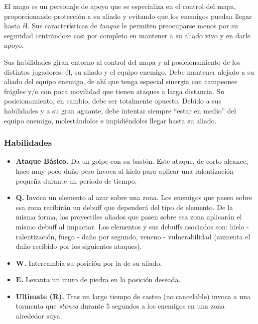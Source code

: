 El mago es un personaje de apoyo que se especializa en el control del mapa, proporcionando protección a su aliado y evitando que los enemigos puedan llegar hasta él. Sus características de \emph{tanque} le permiten preocuparse menos por su seguridad centrándose casi por completo en mantener a su aliado vivo y en darle apoyo.

Sus habilidades giran entorno al control del mapa y al posicionamiento de los distintos jugadores: él, su aliado y el equipo enemigo. Debe mantener alejado a su aliado del equipo enemigo, de ahí que tenga especial sinergia con campeones frágiles y/o con poca movilidad que tienen ataques a larga distancia. Su posicionamiento, en cambio, debe ser totalmente opuesto. Debido a sus habilidades y a su gran aguante, debe intentar siempre ``estar en medio'' del equipo enemigo, molestándolos e impidiéndoles llegar hasta su aliado.

\subsubsection{Habilidades}
\begin{itemize}
\item \textbf{Ataque Básico.} Da un golpe con su bastón. Este ataque, de corto alcance, hace muy poco daño pero invoca al hielo para aplicar una ralentización pequeña durante un periodo de tiempo.
\item \textbf{Q.} Invoca un elemento al azar sobre una zona. Los enemigos que pasen sobre esa zona recibirán un debuff que dependerá del tipo de elemento. De la misma forma, los proyectiles aliados que pasen sobre esa zona aplicarán el mismo debuff al impactar. Los elementos y sus debuffs asociados son: hielo - ralentización, fuego - daño por segundo, veneno - vulnerabilidad (aumenta el daño recibido por los siguientes ataques).
\item \textbf{W.} Intercambia su posición por la de su aliado.
\item \textbf{E.} Levanta un muro de piedra en la posición deseada.
\item \textbf{Ultimate (R).} Tras un largo tiempo de casteo (no cancelable) invoca a una tormenta que \emph{stunea} durante 5 segundos a los enemigos en una zona alrededor suya.
\end{itemize}

\newpage